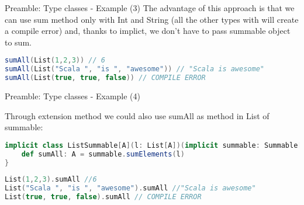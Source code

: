 \begin{frame}[fragile]{Preamble: Type classes - Example (3)}
	The advantage of this approach is that we can use sum method only with Int and String (all the other types with will create 
	a compile error) and, thanks to implict, we don't have to pass summable object to sum.
	
\begin{lstlisting}[language=scala]
sumAll(List(1,2,3)) // 6
sumAll(List("Scala ", "is ", "awesome")) // "Scala is awesome"
sumAll(List(true, true, false)) // COMPILE ERROR				
\end{lstlisting}

\end{frame}
	
\begin{frame}[fragile]{Preamble: Type classes - Example (4)}
	
	Through extension method we could also use sumAll as method in List of summable:
\begin{lstlisting}[language=scala]
implicit class ListSummable[A](l: List[A])(implicit summable: Summable[A]) {
	def sumAll: A = summable.sumElements(l)
}
\end{lstlisting}	
	
	\pause
	
\begin{lstlisting}[language=scala]
List(1,2,3).sumAll //6
List("Scala ", "is ", "awesome").sumAll //"Scala is awesome"
List(true, true, false).sumAll // COMPILE ERROR
\end{lstlisting}
\end{frame}